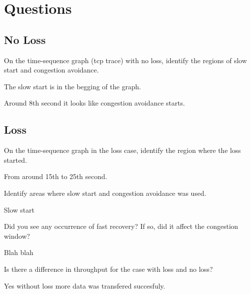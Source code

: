 \documentclass{article}
\begin{document}
\clearpage
\section*{Questions}
\subsection*{No Loss}
\noindent
On the time-sequence graph (tcp trace) with no loss, identify the regions of slow start and congestion avoidance.

The slow start is in the begging of the graph.

Around 8th second it looks like congestion avoidance starts.

\subsection*{Loss}
\noindent
On the time-sequence graph in the loss case, identify the region where the loss started.

From around 15th to 25th second.

\noindent
Identify areas where slow start and congestion avoidance was used.

Slow start

\noindent
Did you see any occurrence of fast recovery? If so, did it affect the congestion window?

Blah blah

\noindent
Is there a difference in throughput for the case with loss and no loss?

Yes without loss more data was transfered succesfuly.
\end{document}

